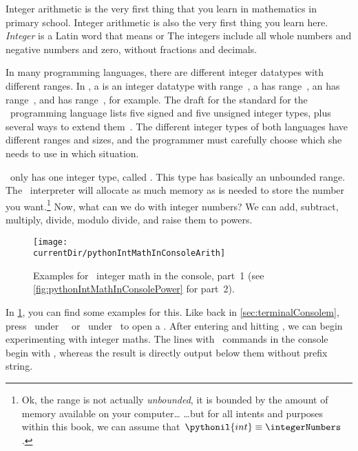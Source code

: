 %
\label{sec:int}%
%
Integer arithmetic is the very first thing that you learn in mathematics in primary school.
Integer arithmetic is also the very first thing you learn here.
\emph{Integer} is a Latin word that means  or 
The integers include all whole numbers and negative numbers and zero, without fractions and decimals.

In many programming languages, there are different integer datatypes with different ranges.
In , a  is an integer datatype with range~, a  has range~, an  has range~, and  has range~, for example.
The draft for the  standard for the ~programming language lists five signed and five unsigned integer types, plus several ways to extend them~\cite{ISOIEC207PLCWDOS}.
The different integer types of both languages have different ranges and sizes, and the programmer must carefully choose which she needs to use in which situation.

\python\ only has one integer type, called .
This type has basically an unbounded range.
The \python\ interpreter will allocate as much memory as is needed to store the number you want.\footnote{%
Ok, the range is not actually \emph{unbounded}, it is bounded by the amount of memory available on your computer{\dots} {\dots}but for all intents and purposes within this book, we can assume that~$\pythonil{int}\equiv\integerNumbers$.}%
%
%
Now, what can we do with integer numbers?
We can add, subtract, multiply, divide, modulo divide, and raise them to powers.

\begin{figure}%
\centering%
\texttt{[image: \\currentDir/pythonIntMathInConsoleArith]}%
\caption{Examples for \python\ integer math in the console, part~1 (see \cref{fig:pythonIntMathInConsolePower} for part~2).}%
\label{fig:pythonIntMathInConsoleArith}%
\end{figure}%

In \cref{fig:pythonIntMathInConsoleArith}, you can find some examples for this.
Like back in \cref{sec:terminalConsolem}, press \ubuntuTerminal\ under \ubuntu\ \linux\ or \windowsTerminal\ under \windows\ to open a .
After entering  and hitting \keys{\enter}, we can begin experimenting with integer maths.
The lines with \python\ commands in the console begin with \pythonil{>>>}, whereas the result is directly output below them without prefix string.

